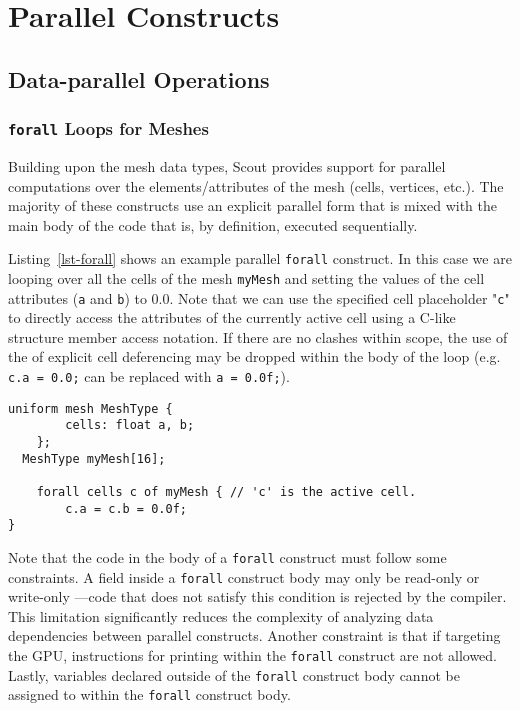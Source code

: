 \let\clearforchapter\par %


\chapter{Parallel Constructs}

\section{Data-parallel Operations}

\subsection{\texttt{forall} Loops for Meshes}

Building upon the mesh data types, Scout provides support for parallel computations over the 
elements/attributes of the mesh (cells, vertices, etc.).  The majority of these constructs 
use an explicit parallel form that is mixed with the main body of the code that is, by 
definition, executed sequentially.  

Listing~\ref{lst-forall} shows an example parallel 
\texttt{forall} construct.  In this case we are looping over all the cells of the mesh 
\texttt{myMesh} and setting the values of the cell attributes (\texttt{a} and \texttt{b})
to $0.0$.  Note that we can use the specified cell placeholder "\texttt{c}" to directly
access the attributes of the currently active cell using a C-like structure member access
notation.  If there are no clashes within scope, the use of the of explicit cell deferencing
may be dropped within the body of the loop (e.g. \texttt{c.a = 0.0;} can be replaced with
\texttt{a = 0.0f;}).

\par\bigskip
\begin{lstlisting}[float=t,label=lst-forall,
	caption={A \texttt{forall} loop construct.}]
	uniform mesh MeshType {
		cells: float a, b;
	};
  MeshType myMesh[16];

	forall cells c of myMesh { // 'c' is the active cell.
		c.a = c.b = 0.0f;
}
\end{lstlisting}
\par\bigskip\noindent

Note that the code in the body of a \texttt{forall} construct must follow some
constraints.  A field inside a \texttt{forall} construct body may only be
read-only or write-only —code that does not satisfy this condition is rejected by the compiler. 
This limitation significantly reduces the complexity of analyzing data dependencies between 
parallel constructs.  Another constraint is that if targeting the GPU, instructions for printing
within the \texttt{forall} construct are not allowed.  Lastly, variables declared outside
of the \texttt{forall} construct body cannot be assigned to within the \texttt{forall}
construct body.

